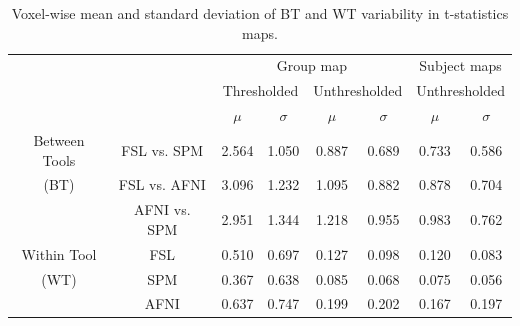 \documentclass[11pt,onecolumn]{article}
\begin{document}
\setlength{\tabcolsep}{5pt}
\begin{table}[h]
  \centering
  \begin{tabular}{cccccc|cc}
    \toprule
                      &              & \multicolumn{4}{c|}{Group map}  & \multicolumn{2}{c}{Subject maps}                                                                     \\
    \multirow{2}{*}{} & {}           & \multicolumn{2}{c}{Thresholded} & \multicolumn{2}{c|}{Unthresholded} & \multicolumn{2}{c}{Unthresholded}                               \\
    {}                & {}           & $\mu$                           & $\sigma$                           & $\mu$                             & $\sigma$ & $\mu$ & $\sigma$ \\
    \midrule
    \rowcolor{lightgray!50}
    {Between Tools}   & FSL vs. SPM  & 2.564                           & 1.050                              & 0.887                             & 0.689    & 0.733 & 0.586    \\
    \rowcolor{lightgray!50}
    {(BT)}            & FSL vs. AFNI & 3.096                           & 1.232                              & 1.095                             & 0.882    & 0.878 & 0.704    \\
    \rowcolor{lightgray!50}
    {}                & AFNI vs. SPM & 2.951                           & 1.344                              & 1.218                             & 0.955    & 0.983 & 0.762    \\
    {Within Tool}     & FSL          & 0.510                           & 0.697                              & 0.127                             & 0.098    & 0.120 & 0.083    \\
    {(WT)}            & SPM          & 0.367                           & 0.638                              & 0.085                             & 0.068    & 0.075 & 0.056    \\
    {}                & AFNI         & 0.637                           & 0.747                              & 0.199                             & 0.202    & 0.167 & 0.197    \\
    \bottomrule
  \end{tabular}
  \caption{Voxel-wise mean and standard deviation of BT and WT variability
    in t-statistics maps.}
  \label{table:pipeline-stats}
\end{table}
\end{document}
